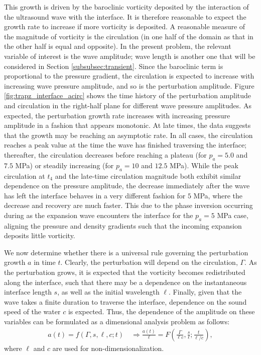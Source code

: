 \documentclass{jfm}%
\begin{document}
This growth is driven by the baroclinic vorticity deposited by the
interaction of the ultrasound wave with the interface. It is therefore
reasonable to expect the growth rate to increase if more vorticity is
deposited. A reasonable measure of the magnitude of vorticity is the
circulation (in one half of the domain as that in the other half is
equal and opposite). In the present problem, the relevant variable of
interest is the wave amplitude; wave length is another one that will
be considered in Section \ref{subsubsec:transient}. Since the
baroclinic term is proportional to the pressure gradient, the
circulation is expected to increase with increasing wave pressure
amplitude, and so is the perturbation amplitude. Figure
\ref{fig:trapz_interface_acirc} shows the time history of the
perturbation amplitude and circulation in the right-half plane for
different wave pressure amplitudes. As expected, the perturbation
growth rate increases with increasing pressure amplitude in a fashion
that appears monotonic. At late times, the data suggests that the
growth may be reaching an asymptotic rate. In all cases, the
circulation reaches a peak value at the time the wave has finished
traversing the interface; thereafter, the circulation decreases before
reaching a plateau (for $p_a = 5.0$ and $7.5$ MPa) or steadily increasing
(for $p_a = 10$ and $12.5$ MPa). While the peak circulation at $t_4$ and the
late-time circulation magnitude both exhibit similar dependence on the
pressure amplitude, the decrease immediately after the wave has left
the interface behaves in a very different fashion for $5$ MPa, where
the decrease and recovery are much faster. This due to the phase
inversion occurring during as the expansion wave encounters the
interface for the $p_a = 5$ MPa case, aligning the pressure and density
gradients such that the incoming expansion deposits little vorticity.

We now determine whether there is a universal rule governing the
perturbation growth $a$ in time $t$. Clearly, the perturbation will
depend on the circulation, $\Gamma$. As the perturbation grows, it is
expected that the vorticity becomes redistributed along the interface,
such that there may be a dependence on the instantaneous interface
length $s$, as well as the initial wavelength $\ell$. Finally, given
that the wave takes a finite duration to traverse the interface,
dependence on the sound speed of the water $c$ is expected. Thus, the
dependence of the amplitude on these variables can be formulated as a
dimensional analysis problem as follows:
\begin{align}
  \label{eq:dimensional_amplitude}
  a(t)=f(\Gamma, s, \ell, c; t) \quad \Rightarrow \frac{a(t)}{\ell} = F\left(\frac{\Gamma}{\ell c}, \frac{s}{\ell}; \frac{t}{\ell/c}\right),
\end{align}
where $\ell$ and $c$ are used for non-dimensionalization.
\end{document}
